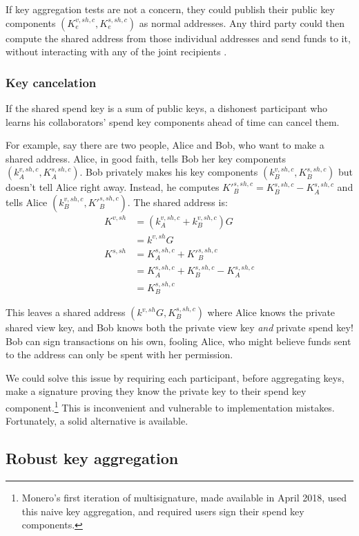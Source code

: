 If key aggregation tests are not a concern, they could publish their public key components $(K^{v,sh,c}_e,K^{s,sh,c}_e)$ as normal addresses. Any third party could then compute the shared address from those individual addresses and send funds to it, without interacting with any of the joint recipients \cite{maxwell2018simple}.

\subsubsection*{Key cancelation}

If the shared spend key is a sum of public keys, a dishonest participant who learns his collaborators' spend key components ahead of time can cancel them. 

For example, say there are two people, Alice and Bob, who want to make a shared address. Alice, in good faith, tells Bob her key components $(k^{v,sh,c}_A,K^{s,sh,c}_A)$. Bob privately makes his key components $(k^{v,sh,c}_B,K^{s,sh,c}_B)$ but doesn't tell Alice right away. Instead, he computes $K'^{s,sh,c}_B = K^{s,sh,c}_B - K^{s,sh,c}_A$ and tells Alice $(k^{v,sh,c}_B,K'^{s,sh,c}_B)$. The shared address is:
\begin{align*}
    K^{v,sh} &= (k^{v,sh,c}_A + k^{v,sh,c}_B) G \\
             &= k^{v,sh} G\\
    K^{s,sh} &= K^{s,sh,c}_A + K'^{s,sh,c}_B \\
             &= K^{s,sh,c}_A + K^{s,sh,c}_B - K^{s,sh,c}_A\\
             &= K^{s,sh,c}_B
\end{align*}

This leaves a shared address $(k^{v,sh} G,K^{s,sh,c}_B)$ where Alice knows the private shared view key, and Bob knows both the private view key {\em and} private spend key! Bob can sign transactions on his own, fooling Alice, who might believe funds sent to the address can only be spent with her permission.

We could solve this issue by requiring each participant, before aggregating keys, make a signature proving they know the private key to their spend key component.\footnote{Monero's first iteration of multisignature, made available in April 2018, used this naive key aggregation, and required users sign their spend key components.} This is inconvenient and vulnerable to implementation mistakes. Fortunately, a solid alternative is available.

\subsection{Robust key aggregation}
\label{sec:robust-key-aggregation}

